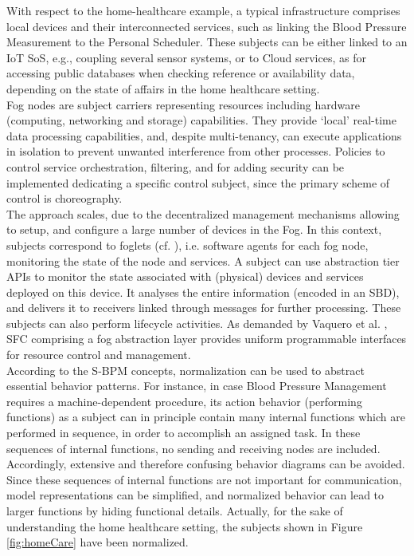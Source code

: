 With respect to the home-healthcare example, a typical infrastructure comprises local devices and their interconnected services, such as linking the Blood Pressure Measurement to the Personal Scheduler. These subjects can be either linked to an IoT SoS, e.g., coupling several sensor systems, or to Cloud services, as for accessing public databases when checking reference or availability data, depending on the state of affairs in the home healthcare setting.
\\
Fog nodes are subject carriers representing resources including hardware (computing, networking and storage) capabilities. They provide ‘local’ real-time data processing capabilities, and, despite multi-tenancy, can execute applications in isolation to prevent unwanted interference from other processes. Policies to control service orchestration, filtering, and for adding security can be implemented dedicating a specific control subject, since the primary scheme of control is choreography.
\\
The approach scales, due to the decentralized management mechanisms allowing to setup, and configure a large number of devices in the Fog. In this context, subjects correspond to foglets (cf. \cite{article:OoTAnalytics}), i.e. software agents for each fog node, monitoring the state of the node and services. A subject can use abstraction tier APIs to monitor the state associated with (physical) devices and services deployed on this device. It analyses the entire information (encoded in an SBD), and delivers it to receivers linked through messages for further processing. These subjects can also perform lifecycle activities. As demanded by Vaquero et al. \cite{article:FiningwayFog}, SFC comprising a fog abstraction layer provides uniform programmable interfaces for resource control and management.
\\
According to the S-BPM concepts, normalization can be used to abstract essential behavior patterns. For instance, in case Blood Pressure Management requires a machine-dependent procedure, its action behavior (performing functions) as a subject can in principle contain many internal functions which are performed in sequence, in order to accomplish an assigned task. In these sequences of internal functions, no sending and receiving nodes are included. Accordingly, extensive and therefore confusing behavior diagrams can be avoided. Since these sequences of internal functions are not important for communication, model representations can be simplified, and normalized behavior can lead to larger functions by hiding functional details. Actually, for the sake of understanding the home healthcare setting, the subjects shown in Figure \ref{fig:homeCare} have been normalized.
